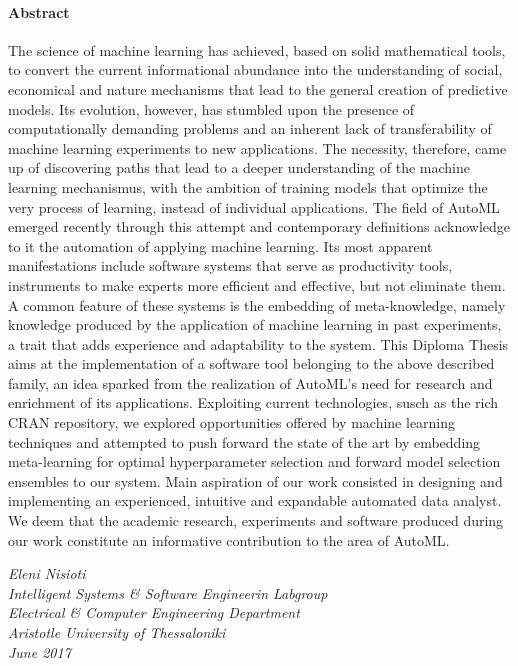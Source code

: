 {	\paragraph{Abstract}
	The science of machine learning has achieved, based on solid mathematical tools, to convert the current informational abundance into the under\-standing of social, economical and nature mechanisms that lead to the general creation of predictive models. Its evolution, however, has stumbled upon  the presence of computationally demanding problems and an inherent lack of transferability of machine learning experiments to new applications. The necessity, therefore, came up of discovering paths that lead to a deeper understanding of the machine learning mecha\-nismus, with the ambition of training models that optimize the very process of learning, instead of individual applications. The field of \gls{AutoML} emerged recently through this attempt and contempo\-rary definitions acknowledge to it the automation of applying machine learning. Its most apparent manifestations  include software systems that serve as productivity tools, instruments to make experts more efficient and effective, but not eliminate them. A common feature of these systems is the embedding of meta-knowledge, namely knowledge produced by the application of machine learning in past experi\-ments, a trait that adds experience and adaptability to the system. This Diploma Thesis aims at the implementation of a software tool belonging to the above described family, an idea sparked from the realization of \gls{AutoML}'s need for research and enrichment of its applications. Exploiting current technologies, susch as the rich CRAN repository, we explored opportunities offered by machine learning techniques and attempted to push forward the state of the art by embedding meta-learning for optimal hyperparameter selection and forward model selection ensembles to our system. Main aspiration of our work consisted in designing and implementing an experien\-ced, intuitive and expandable automated data analyst. We deem that the acade\-mic research, experiments and software produced during our work constitute an informa\-tive contribu\-tion to the area of \gls{AutoML}.       
	
	\vspace{2cm}
	
	\begin{flushleft}
		\textit{Eleni Nisioti \\
		Intelligent Systems \& Software Engineerin Labgroup\\
		Electrical \& Computer Engineering Department\\
		Aristotle University of Thessaloniki\\
		June 2017}
	\end{flushleft}
	
}

